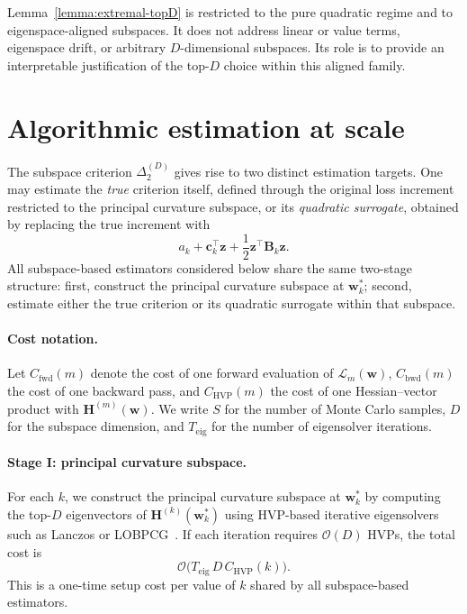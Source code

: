 \documentclass[10pt]{article}
\theoremstyle{plain}
\theoremstyle{remark}
\begin{document}
Lemma~\ref{lemma:extremal-topD} is restricted to the pure quadratic regime and to eigenspace-aligned subspaces.
It does not address linear or value terms, eigenspace drift, or arbitrary $D$-dimensional subspaces.
Its role is to provide an interpretable justification of the top-$D$ choice within this aligned family.

\section{Algorithmic estimation at scale}
\label{sec:algo}

The subspace criterion $\Delta_2^{(D)}$ gives rise to two distinct estimation targets.
One may estimate the \emph{true} criterion itself, defined through the original loss increment restricted to the principal curvature subspace, or its \emph{quadratic surrogate}, obtained by replacing the true increment with
\[
a_k + \mathbf c_k^\top \mathbf z + \frac12 \mathbf z^\top \mathbf B_k \mathbf z.
\]
All subspace-based estimators considered below share the same two-stage structure:
first, construct the principal curvature subspace at $\mathbf w_k^*$; second, estimate either the true criterion or its quadratic surrogate within that subspace.

\paragraph{Cost notation.}
Let $C_{\mathrm{fwd}}(m)$ denote the cost of one forward evaluation of $\mathcal L_m(\mathbf w)$, $C_{\mathrm{bwd}}(m)$ the cost of one backward pass, and $C_{\mathrm{HVP}}(m)$ the cost of one Hessian--vector product with $\mathbf H^{(m)}(\mathbf w)$.
We write $S$ for the number of Monte Carlo samples, $D$ for the subspace dimension, and $T_{\mathrm{eig}}$ for the number of eigensolver iterations.

\paragraph{Stage I: principal curvature subspace.}
For each $k$, we construct the principal curvature subspace at $\mathbf w_k^*$ by computing the top-$D$ eigenvectors of $\mathbf H^{(k)}(\mathbf w_k^*)$ using HVP-based iterative eigensolvers such as Lanczos or LOBPCG~\citep{pearlmutter1994fast}.
If each iteration requires $\mathcal O(D)$ HVPs, the total cost is
\[
\mathcal O\!\bigl(T_{\mathrm{eig}}\,D\,C_{\mathrm{HVP}}(k)\bigr).
\]
This is a one-time setup cost per value of $k$ shared by all subspace-based estimators.
\end{document}
